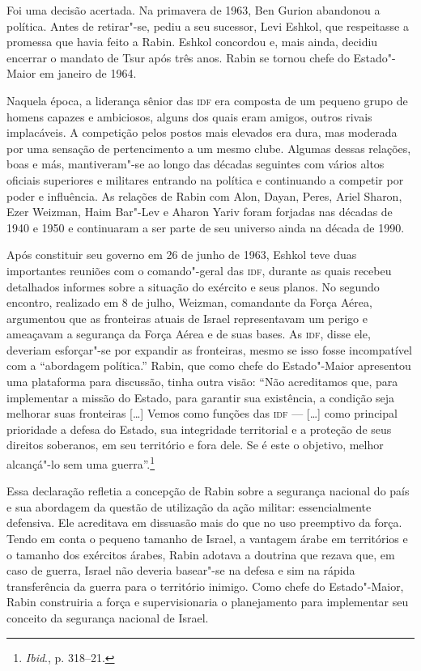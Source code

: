 Foi uma decisão acertada. Na primavera de 1963, Ben Gurion abandonou a
política. Antes de retirar"-se, pediu a seu sucessor, Levi Eshkol, que
respeitasse a promessa que havia feito a Rabin. Eshkol concordou e,
mais ainda, decidiu encerrar o mandato de Tsur após três anos.
Rabin se tornou chefe do Estado"-Maior em janeiro de 1964.

Naquela época, a liderança sênior das \textsc{idf} era composta de um pequeno
grupo de homens capazes e ambiciosos, alguns dos quais eram amigos,
outros rivais implacáveis. A competição pelos postos mais elevados era
dura, mas moderada por uma sensação de pertencimento a um mesmo clube.
Algumas dessas relações, boas e más, mantiveram"-se ao longo das décadas
seguintes com vários altos oficiais superiores e militares entrando na
política e continuando a competir por poder e influência. As relações de
Rabin com Alon, Dayan, Peres, Ariel Sharon, Ezer Weizman, Haim Bar"-Lev e
Aharon Yariv foram forjadas nas décadas de 1940 e 1950 e continuaram a
ser parte de seu universo ainda na década de 1990.

Após constituir seu governo em 26 de junho de 1963, Eshkol teve duas
importantes reuniões com o comando"-geral das \textsc{idf}, durante as quais
recebeu detalhados informes sobre a situação do exército e seus planos.
No segundo encontro, realizado em 8 de julho, Weizman, comandante da
Força Aérea, argumentou que as fronteiras atuais de Israel representavam
um perigo e ameaçavam a segurança da Força Aérea e de suas bases. As
\textsc{idf}, disse ele, deveriam esforçar"-se por expandir as fronteiras, mesmo
se isso fosse incompatível com a ``abordagem política.'' Rabin, que como
chefe do Estado"-Maior apresentou uma plataforma para discussão, tinha
outra visão: ``Não acreditamos que, para implementar a missão do Estado,
para garantir sua existência, a condição seja melhorar suas fronteiras
{[}\ldots{}{]} Vemos como funções das \textsc{idf} --- {[}\ldots{}{]} como principal prioridade a defesa do
Estado, sua integridade territorial e a proteção de seus direitos
soberanos, em seu território e fora dele. Se é este o objetivo, melhor
alcançá"-lo sem uma guerra''.\footnote{\textit{Ibid}., p. 318--21.}

Essa declaração refletia a concepção de Rabin sobre a segurança nacional do
país e sua abordagem da questão de utilização da ação militar:
essencialmente defensiva. Ele acreditava em dissuasão mais do que no uso
preemptivo da força. Tendo em conta o pequeno tamanho de Israel, a
vantagem árabe em territórios e o tamanho dos exércitos árabes, Rabin
adotava a doutrina que rezava que, em caso de guerra, Israel não deveria
basear"-se na defesa e sim na rápida transferência da guerra para o
território inimigo. Como chefe do Estado"-Maior, Rabin construiria a
força e supervisionaria o planejamento para implementar seu conceito da
segurança nacional de Israel.

